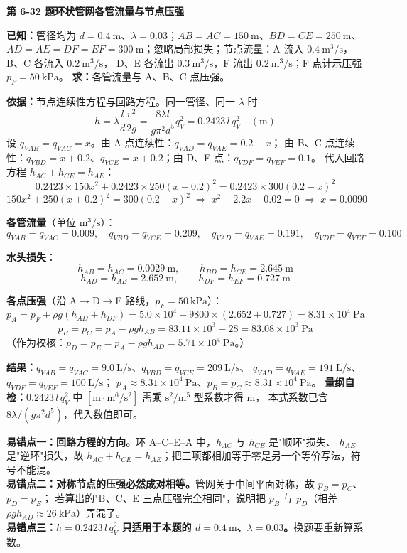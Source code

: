 \noindent\textbf{第 6-32 题\quad 环状管网各管流量与节点压强}

\begin{jie}
\textbf{已知：}管径均为 $d=0.4\ \mathrm{m}$、$\lambda=0.03$；$AB=AC=150\ \mathrm{m}$、$BD=CE=250\ \mathrm{m}$、
$AD=AE=DF=EF=300\ \mathrm{m}$；忽略局部损失；节点流量：A 流入 $0.4\ \mathrm{m^3/s}$，B、C 各流入 $0.2\ \mathrm{m^3/s}$，
D、E 各流出 $0.3\ \mathrm{m^3/s}$，F 流出 $0.2\ \mathrm{m^3/s}$；F 点计示压强 $p_F=50\ \mathrm{kPa}$。
\textbf{求：}各管流量与 A、B、C 点压强。

\textbf{依据：}节点连续性方程与回路方程。同一管径、同一 $\lambda$ 时
\[ h=\lambda\frac ld\frac{\bar v^2}{2g}=\frac{8\lambda l}{g\pi^2d^5}q_V^2=0.2423\,l\,q_V^2\quad(\mathrm{m}) \]
设 $q_{VAB}=q_{VAC}=x$。由 A 点连续性：$q_{VAD}=q_{VAE}=0.2-x$；
由 B、C 点连续性：$q_{VBD}=x+0.2$、$q_{VCE}=x+0.2$；由 D、E 点：$q_{VDF}=q_{VEF}=0.1$。
代入回路方程 $h_{AC}+h_{CE}=h_{AE}$：
\[ 0.2423\times150x^2+0.2423\times250(x+0.2)^2=0.2423\times300(0.2-x)^2 \]
\[ 150x^2+250(x+0.2)^2=300(0.2-x)^2\;\Longrightarrow\;x^2+2.2x-0.02=0\;\Longrightarrow\;x=0.0090 \]

\textbf{各管流量}（单位 $\mathrm{m^3/s}$）：
\[ q_{VAB}=q_{VAC}=0.009,\quad q_{VBD}=q_{VCE}=0.209,\quad
q_{VAD}=q_{VAE}=0.191,\quad q_{VDF}=q_{VEF}=0.100 \]

\textbf{水头损失}：
\[ h_{AB}=h_{AC}=0.0029\ \mathrm{m},\qquad h_{BD}=h_{CE}=2.645\ \mathrm{m} \]
\[ h_{AD}=h_{AE}=2.652\ \mathrm{m},\qquad h_{DF}=h_{EF}=0.727\ \mathrm{m} \]

\textbf{各点压强}（沿 A$\to$D$\to$F 路线，$p_F=50\ \mathrm{kPa}$）：
\[ p_A=p_F+\rho g(h_{AD}+h_{DF})=5.0\times10^4+9800\times(2.652+0.727)=8.31\times10^4\ \mathrm{Pa} \]
\[ p_B=p_C=p_A-\rho g h_{AB}=83.11\times10^3-28=83.08\times10^3\ \mathrm{Pa} \]
（作为校核：$p_D=p_E=p_A-\rho g h_{AD}=5.71\times10^4\ \mathrm{Pa}$。）

\textbf{结果：}$q_{VAB}=q_{VAC}=9.0\ \mathrm{L/s}$、$q_{VBD}=q_{VCE}=209\ \mathrm{L/s}$、
$q_{VAD}=q_{VAE}=191\ \mathrm{L/s}$、$q_{VDF}=q_{VEF}=100\ \mathrm{L/s}$；
$p_A\approx8.31\times10^4\ \mathrm{Pa}$、$p_B=p_C\approx8.31\times10^4\ \mathrm{Pa}$。
\textbf{量纲自检：}$0.2423\,l\,q_V^2$ 中 $[\mathrm{m\cdot m^6/s^2}]$ 需乘 $\mathrm{s^2/m^5}$ 型系数才得 $\mathrm{m}$，
本式系数已含 $8\lambda/(g\pi^2d^5)$，代入数值即可。
\end{jie}

\begin{yicuo}
\textbf{易错点一：回路方程的方向。}环 A--C--E--A 中，$h_{AC}$ 与 $h_{CE}$ 是"顺环"损失、
$h_{AE}$ 是"逆环"损失，故 $h_{AC}+h_{CE}=h_{AE}$；把三项都相加等于零是另一个等价写法，符号不能混。\\
\textbf{易错点二：对称节点的压强必然成对相等。}管网关于中间平面对称，故 $p_B=p_C$、$p_D=p_E$；
若算出的"B、C、E 三点压强完全相同"，说明把 $p_B$ 与 $p_D$（相差 $\rho gh_{AD}\approx26\ \mathrm{kPa}$）弄混了。\\
\textbf{易错点三：$h=0.2423\,l\,q_V^2$ 只适用于本题的 $d=0.4\ \mathrm{m}$、$\lambda=0.03$。}换题要重新算系数。
\end{yicuo}

